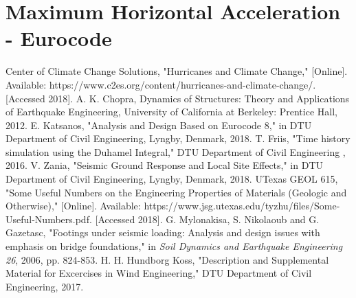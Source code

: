 \documentclass[11pt,a4paper,titlepage]{report}
\begin{document}
\section{Maximum Horizontal Acceleration - Eurocode}
\newpage
\begin{thebibliography}{8}
Center of Climate Change Solutions, "Hurricanes and Climate Change," [Online]. Available: https://www.c2es.org/content/hurricanes-and-climate-change/. [Accessed 2018].
A. K. Chopra, Dynamics of Structures: Theory and Applications of Earthquake Engineering, University of California at Berkeley: Prentice Hall, 2012. 
E. Katsanos, "Analysis and Design Based on Eurocode 8," in DTU Department of Civil Engineering, Lyngby, Denmark, 2018. 
T. Friis, "Time history simulation using the Duhamel Integral," DTU Department of Civil Engineering , 2016.
V. Zania, "Seismic Ground Response and Local Site Effects," in DTU Department of Civil Engineering, Lyngby, Denmark, 2018. 
UTexas GEOL 615, "Some Useful Numbers on the Engineering Properties of Materials (Geologic and Otherwise)," [Online]. Available: https://www.jsg.utexas.edu/tyzhu/files/Some-Useful-Numbers.pdf. [Accessed 2018].
G. Mylonakisa, S. Nikolaoub and G. Gazetasc, "Footings under seismic loading: Analysis and design issues with emphasis on bridge foundations," in \textit{Soil Dynamics and Earthquake Engineering 26}, 2006, pp. 824-853.
H. H. Hundborg Koss, "Description and Supplemental Material for Excercises in Wind Engineering," DTU Department of Civil Engineering, 2017.
\end{thebibliography}
\newpage
\end{document}
